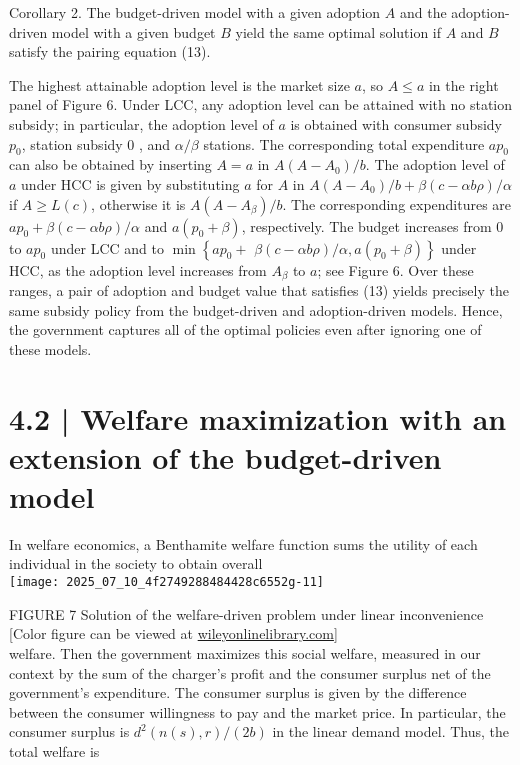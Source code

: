 \documentclass[10pt]{article}
\begin{document}
Corollary 2. The budget-driven model with a given adoption $A$ and the adoption-driven model with a given budget $B$ yield the same optimal solution if $A$ and $B$ satisfy the pairing equation (13).

The highest attainable adoption level is the market size $a$, so $A \leq a$ in the right panel of Figure 6. Under LCC, any adoption level can be attained with no station subsidy; in particular, the adoption level of $a$ is obtained with consumer subsidy $p_{0}$, station subsidy 0 , and $\alpha / \beta$ stations. The corresponding total expenditure $a p_{0}$ can also be obtained by inserting $A=a$ in $A\left(A-A_{0}\right) / b$. The adoption level of $a$ under HCC is given by substituting $a$ for $A$ in $A\left(A-A_{0}\right) / b+\beta(c-\alpha b \rho) / \alpha$ if $A \geq L(c)$, otherwise it is $A\left(A-A_{\beta}\right) / b$. The corresponding expenditures are $a p_{0}+\beta(c-\alpha b \rho) / \alpha$ and $a\left(p_{0}+\beta\right)$, respectively. The budget increases from 0 to $a p_{0}$ under LCC and to $\min \left\{a p_{0}+\right.$ $\left.\beta(c-\alpha b \rho) / \alpha, a\left(p_{0}+\beta\right)\right\}$ under HCC, as the adoption level increases from $A_{\beta}$ to $a$; see Figure 6. Over these ranges, a pair of adoption and budget value that satisfies (13) yields precisely the same subsidy policy from the budget-driven and adoption-driven models. Hence, the government captures all of the optimal policies even after ignoring one of these models.

\section*{4.2 | Welfare maximization with an extension of the budget-driven model}
In welfare economics, a Benthamite welfare function sums the utility of each individual in the society to obtain overall\\
\texttt{[image: 2025\_07\_10\_4f2749288484428c6552g-11]}

FIGURE 7 Solution of the welfare-driven problem under linear inconvenience [Color figure can be viewed at \href{http://wileyonlinelibrary.com}{wileyonlinelibrary.com}]\\
welfare. Then the government maximizes this social welfare, measured in our context by the sum of the charger's profit and the consumer surplus net of the government's expenditure. The consumer surplus is given by the difference between the consumer willingness to pay and the market price. In particular, the consumer surplus is $d^{2}(n(s), r) /(2 b)$ in the linear demand model. Thus, the total welfare is
\end{document}
